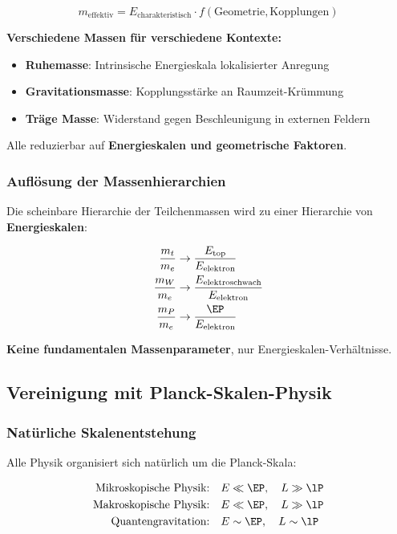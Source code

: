 	\begin{equation}
		m_{\text{effektiv}} = E_{\text{charakteristisch}} \cdot f(\text{Geometrie}, \text{Kopplungen})
		\label{eq:emergent_mass}
	\end{equation}
	
	\textbf{Verschiedene Massen für verschiedene Kontexte:}
	\begin{itemize}
		\item \textbf{Ruhemasse}: Intrinsische Energieskala lokalisierter Anregung
		\item \textbf{Gravitationsmasse}: Kopplungsstärke an Raumzeit-Krümmung  
		\item \textbf{Träge Masse}: Widerstand gegen Beschleunigung in externen Feldern
	\end{itemize}
	
	Alle reduzierbar auf \textbf{Energieskalen und geometrische Faktoren}.
	
	\subsubsection{Auflösung der Massenhierarchien}
	
	Die scheinbare Hierarchie der Teilchenmassen wird zu einer Hierarchie von \textbf{Energieskalen}:
	
	\begin{align}
		\frac{m_t}{m_e} &\rightarrow \frac{E_{\text{top}}}{E_{\text{elektron}}} \\
		\frac{m_W}{m_e} &\rightarrow \frac{E_{\text{elektroschwach}}}{E_{\text{elektron}}} \\
		\frac{m_P}{m_e} &\rightarrow \frac{\EP}{E_{\text{elektron}}}
	\end{align}
	
	\textbf{Keine fundamentalen Massenparameter}, nur Energieskalen-Verhältnisse.
	
	\subsection{Vereinigung mit Planck-Skalen-Physik}
	\label{subsec:planck_unification}
	
	\subsubsection{Natürliche Skalenentstehung}
	
	Alle Physik organisiert sich natürlich um die Planck-Skala:
	
	\begin{align}
		\text{Mikroskopische Physik:} \quad &E \ll \EP, \quad L \gg \lP \\
		\text{Makroskopische Physik:} \quad &E \ll \EP, \quad L \gg \lP \\
		\text{Quantengravitation:} \quad &E \sim \EP, \quad L \sim \lP
	\end{align}
	
